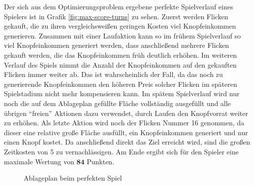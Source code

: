 Der sich aus dem Optimierungsproblem ergebene perfekte Spielverlauf eines Spielers ist in Grafik \ref{fig:max-score-turns} zu sehen. Zuerst werden Flicken gekauft, die zu ihren vergleichsweißen geringen Kosten viel Knopfeinkommen generieren. Zusammen mit einer Laufaktion kann so im frühem Spielverlauf so viel Knopfeinkommen generiert werden, dass anschließend mehrere Flicken gekauft werden, die das Knopfeinkommen früh deutlich erhöhen. Im weiteren Verlauf des Spiels nimmt die Anzahl der Knopfeinkommen auf den gekauften Flicken immer weiter ab. Das ist wahrscheinlich der Fall, da das noch zu generierende Knopfeinkommen den höheren Preis solcher Flicken im späteren Spielstadium nicht mehr kompensieren kann. Im spätem Spielverlauf wird nur noch die auf dem Ablageplan gefüllte Fläche vollständig ausgefüllt und alle übrigen \enquote{freien} Aktionen dazu verwendet, durch Laufen den Knopfvorrat weiter zu erhöhen. Als letzte Aktion wird noch der Flicken Nummer 16 genommen, da dieser eine relative große Fläche ausfüllt, ein Knopfeinkommen generiert und nur einen Knopf kostet. Da anschließend direkt das Ziel erreicht wird, sind die großen Zeitkosten von 5 zu vernachlässigen. Am Ende ergibt sich für den Spieler eine maximale Wertung von $\boldsymbol{84}$ Punkten.

\pagebreak

\begin{figure}
    \centering
    \caption[Ablageplan beim perfekten Spiel]{\unskip}
    Ablageplan beim perfekten Spiel
    \label{fig:patchwork-cover}
    \label{fig:max-score-quilt-board}
    \vspace*{-0.75cm}
\end{figure}


